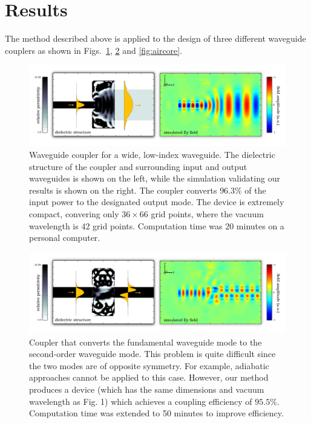 \documentclass[letterpaper,10pt]{article}
\begin{document}
\section{Results}
The method described above is applied to 
    the design of three different waveguide couplers
    as shown in Figs.~\ref{fig:fiber}, \ref{fig:mode} and \ref{fig:aircore}.




\begin{figure}[htbp]
    \centering
    \includegraphics[width=\textwidth]{fig/fiber} 
    \caption{Waveguide coupler for a wide, low-index waveguide. 
        The dielectric structure of the coupler and surrounding input and
        output waveguides is shown on the left, while the simulation
        validating our results is shown on the right.
        The coupler converts $96.3\%$ of the input power to the
        designated output mode.
        The device is extremely compact, 
        convering only $36 \times 66$ grid points,
        where the vacuum wavelength is 42 grid points.
        Computation time was 20 minutes on a personal computer.}
    \label{fig:fiber}
\end{figure}
\begin{figure}[htbp]
    \centering
    \includegraphics[width=\textwidth]{fig/mode-conv} 
    \caption{Coupler that converts the fundamental waveguide mode to the
        second-order waveguide mode.
        This problem is quite difficult since the two modes are of 
        opposite symmetry.
        For example, adiabatic approaches cannot be applied to this case.
        However, our method produces a device 
        (which has the same dimensions and vacuum wavelength as Fig. 1) 
        which achieves a coupling efficiency of $95.5\%$. 
        Computation time was extended to 50 minutes to improve efficiency.
        }
    \label{fig:mode}
    \end{figure}
\end{document}
